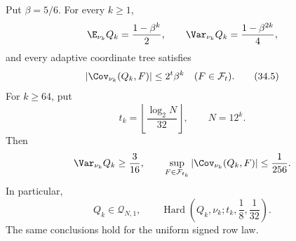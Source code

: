 \begin{theorem}
\label{ian:hadamard-explicit-target}
Put \(\beta=5/6\). For every \(k\ge1\),
\[
 \E_{\nu_k}Q_k=\frac{1-\beta^k}{2},
 \qquad
 \Var_{\nu_k}Q_k=\frac{1-\beta^{2k}}4,
\]
and every adaptive coordinate tree satisfies
\[
 |\Cov_{\nu_k}(Q_k,F)|\le2^t\beta^k
 \quad(F\in\mathcal F_t).
 \tag{34.5}\label{ian:hadamard-explicit-covariance}
\]
For \(k\ge64\), put
\[
 t_k=\left\lfloor\frac{\log_2N}{32}\right\rfloor,
 \qquad N=12^k.
\]
Then
\[
 \Var_{\nu_k}Q_k\ge\frac3{16},
 \qquad
 \sup_{F\in\mathcal F_{t_k}}
 |\Cov_{\nu_k}(Q_k,F)|\le\frac1{256}.
\]
In particular,
\[
 Q_k\in\mathcal Q_{N,1},
 \qquad
 \operatorname{Hard}\left(
 Q_k,\nu_k;t_k,\frac18,\frac1{32}\right).
 \tag{34.6}\label{ian:hadamard-explicit-hard-sector}
\]
The same conclusions hold for the uniform signed row law.
\end{theorem}
